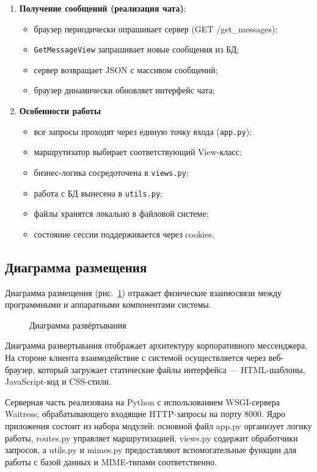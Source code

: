 \begin{enumerate}[leftmargin=*,label=\textbf{\arabic*.}]
	\item \textbf{Получение сообщений (реализация чата)};
	\begin{itemize}
		\item браузер периодически опрашивает сервер (GET /get\_messages);
		\item \texttt{GetMessageView} запрашивает новые сообщения из БД;
		\item сервер возвращает JSON с массивом сообщений;
		\item браузер динамически обновляет интерфейс чата;
	\end{itemize}
	
	\item \textbf{Особенности работы}
	\begin{itemize}
		\item все запросы проходят через единую точку входа (\texttt{app.py});
		\item маршрутизатор выбирает соответствующий View-класс;
		\item бизнес-логика сосредоточена в \texttt{views.py};
		\item работа с БД вынесена в \texttt{utils.py};
		\item файлы хранятся локально в файловой системе;
		\item состояние сессии поддерживается через cookies.
	\end{itemize}
\end{enumerate}

\subsection{Диаграмма размещения}

Диаграмма размещения (рис.~\ref{place:image}) отражает физические взаимосвязи между программными и аппаратными компонентами системы.

\begin{figure}[ht]
\caption{Диаграмма развёртывания}
\label{place:image}
\end{figure}

Диаграмма развертывания отображает архитектуру корпоративного мессенджера. На стороне клиента взаимодействие с системой осуществляется через веб-браузер, который загружает статические файлы интерфейса — HTML-шаблоны, JavaScript-код и CSS-стили.  

Серверная часть реализована на Python с использованием WSGI-сервера Waitress, обрабатывающего входящие HTTP-запросы на порту 8000. Ядро приложения состоит из набора модулей: основной файл app.py организует логику работы, routes.py управляет маршрутизацией, views.py содержит обработчики запросов, а utils.py и mimes.py предоставляют вспомогательные функции для работы с базой данных и MIME-типами соответственно.  

